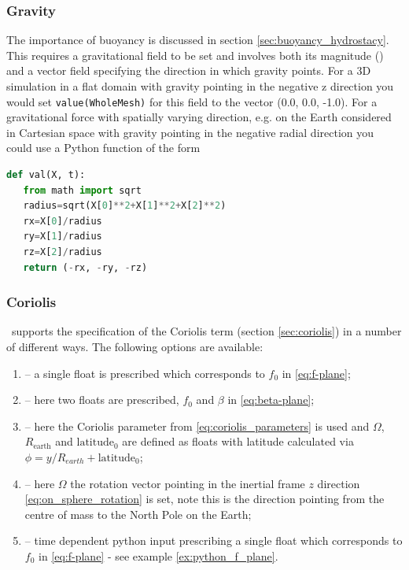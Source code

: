 \subsubsection{Gravity}\label{sec:Gravity}
The importance of buoyancy is discussed in section \ref{sec:buoyancy_hydrostacy}. This
requires a gravitational field to be set and involves both its magnitude
(\eg \mss[9.8]) and a vector field specifying the direction in which gravity
points. For a 3D simulation in a flat domain with gravity pointing in the
negative z direction you would set \verb+value(WholeMesh)+ for this field to
the vector (0.0, 0.0, -1.0). For a gravitational force with spatially
varying direction, e.g. on the Earth considered in Cartesian space with
gravity pointing in the negative radial direction you could use a Python
function of the form
\begin{example}
  \begin{lstlisting}[language=Python]
def val(X, t):
   from math import sqrt
   radius=sqrt(X[0]**2+X[1]**2+X[2]**2)
   rx=X[0]/radius
   ry=X[1]/radius
   rz=X[2]/radius
   return (-rx, -ry, -rz)
  \end{lstlisting}
  \caption{A Python function returning a vector pointing in the negative radial direction.}
\end{example}

\subsubsection{Coriolis}

\fluidity\ supports the specification of the Coriolis term (section
\ref{sec:coriolis}) in a number of different ways. The following options
are available:

\begin{enumerate}
  \item {} -- a single float is prescribed which corresponds to
        $f_0$ in \eqref{eq:f-plane};
  \item {} -- here two floats are prescribed, $f_0$ and
        $\beta$ in \eqref{eq:beta-plane};
  \item {} -- here the Coriolis parameter from
        \eqref{eq:coriolis_parameters} is used and $\Omega$,
        $R_{\textrm{earth}}$ and $\textrm{latitude}_0$ are defined as floats with
        latitude calculated via
        $\phi = y/R_{earth} + \textrm{latitude}_0$;
  \item {} -- here $\Omega$ the rotation vector pointing in the
        inertial frame $z$ direction  \eqref{eq:on_sphere_rotation} is set,
        note this is the direction pointing from the centre of mass to the North
        Pole on the Earth;
 \item {} -- time dependent python input
       prescribing a single float which corresponds to
       $f_0$ in \eqref{eq:f-plane} - see example \ref{ex:python_f_plane}.
\end{enumerate}


